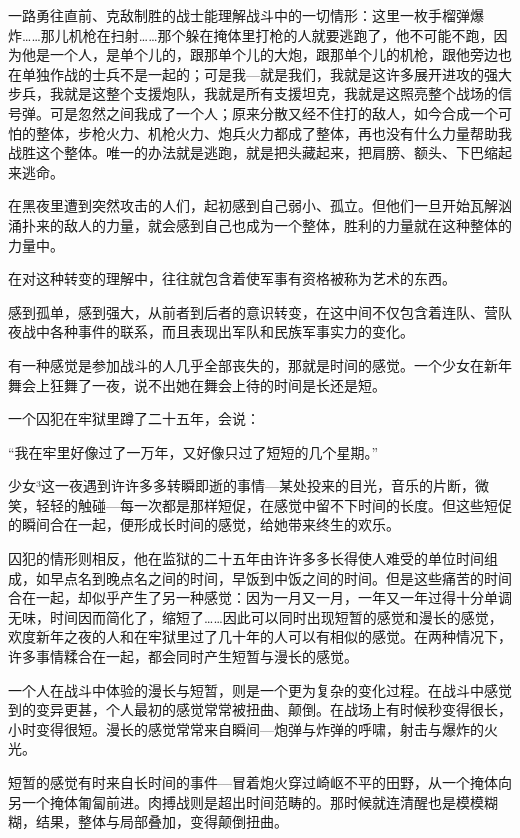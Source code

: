 一路勇往直前、克敌制胜的战士能理解战斗中的一切情形：这里一枚手榴弹爆炸……那儿机枪在扫射……那个躲在掩体里打枪的人就要逃跑了，他不可能不跑，因为他是一个人，是单个儿的，跟那单个儿的大炮，跟那单个儿的机枪，跟他旁边也在单独作战的士兵不是一起的；可是我—就是我们，我就是这许多展开进攻的强大步兵，我就是这整个支援炮队，我就是所有支援坦克，我就是这照亮整个战场的信号弹。可是忽然之间我成了一个人；原来分散又经不住打的敌人，如今合成一个可怕的整体，步枪火力、机枪火力、炮兵火力都成了整体，再也没有什么力量帮助我战胜这个整体。唯一的办法就是逃跑，就是把头藏起来，把肩膀、额头、下巴缩起来逃命。

在黑夜里遭到突然攻击的人们，起初感到自己弱小、孤立。但他们一旦开始瓦解汹涌扑来的敌人的力量，就会感到自己也成为一个整体，胜利的力量就在这种整体的力量中。

在对这种转变的理解中，往往就包含着使军事有资格被称为艺术的东西。

感到孤单，感到强大，从前者到后者的意识转变，在这中间不仅包含着连队、营队夜战中各种事件的联系，而且表现出军队和民族军事实力的变化。

有一种感觉是参加战斗的人几乎全部丧失的，那就是时间的感觉。一个少女在新年舞会上狂舞了一夜，说不出她在舞会上待的时间是长还是短。

一个囚犯在牢狱里蹲了二十五年，会说：

“我在牢里好像过了一万年，又好像只过了短短的几个星期。”

少女³这一夜遇到许许多多转瞬即逝的事情—某处投来的目光，音乐的片断，微笑，轻轻的触碰—每一次都是那样短促，在感觉中留不下时间的长度。但这些短促的瞬间合在一起，便形成长时间的感觉，给她带来终生的欢乐。

囚犯的情形则相反，他在监狱的二十五年由许许多多长得使人难受的单位时间组成，如早点名到晚点名之间的时间，早饭到中饭之间的时间。但是这些痛苦的时间合在一起，却似乎产生了另一种感觉：因为一月又一月，一年又一年过得十分单调无味，时间因而简化了，缩短了……因此可以同时出现短暂的感觉和漫长的感觉，欢度新年之夜的人和在牢狱里过了几十年的人可以有相似的感觉。在两种情况下，许多事情糅合在一起，都会同时产生短暂与漫长的感觉。

一个人在战斗中体验的漫长与短暂，则是一个更为复杂的变化过程。在战斗中感觉到的变异更甚，个人最初的感觉常常被扭曲、颠倒。在战场上有时候秒变得很长，小时变得很短。漫长的感觉常常来自瞬间—炮弹与炸弹的呼啸，射击与爆炸的火光。

短暂的感觉有时来自长时间的事件—冒着炮火穿过崎岖不平的田野，从一个掩体向另一个掩体匍匐前进。肉搏战则是超出时间范畴的。那时候就连清醒也是模模糊糊，结果，整体与局部叠加，变得颠倒扭曲。

